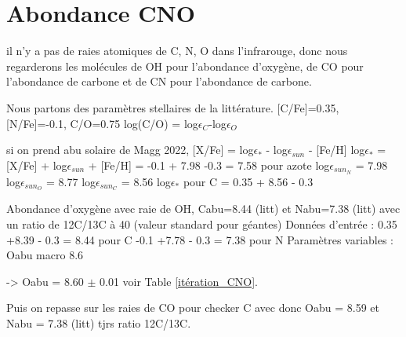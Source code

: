 \section{\sc Abondance CNO}
il n'y a pas de raies atomiques de C, N, O dans l'infrarouge, donc nous regarderons les molécules de OH pour l'abondance d'oxygène, de CO pour l'abondance de carbone et de CN pour l'abondance de carbone. 

Nous partons des paramètres stellaires de la littérature. [C/Fe]=0.35, [N/Fe]=-0.1, C/O=0.75
 log(C/O) = log$\epsilon_C$-log$\epsilon_O$

si on prend abu solaire de Magg 2022, 
[X/Fe] = log$\epsilon_*$ - log$\epsilon_{sun}$ - [Fe/H]
log$\epsilon_*$ = [X/Fe] + log$\epsilon_{sun}$ + [Fe/H]
= -0.1 + 7.98 -0.3 = 7.58 pour azote
log$\epsilon_{sun_N}$ = 7.98
log$\epsilon_{sun_O}$ = 8.77
log$\epsilon_{sun_C}$ = 8.56
log$\epsilon_*$ pour C = 0.35 + 8.56 - 0.3

Abondance d'oxygène avec raie de OH, Cabu=8.44 (litt) et Nabu=7.38 (litt) \cite{grevesse_solar_2007}
avec un ratio de 12C/13C à 40 (valeur standard pour géantes)
Données d'entrée :
0.35 +8.39 - 0.3 = 8.44 pour C
-0.1 +7.78 - 0.3 = 7.38 pour N
Paramètres variables : 
Oabu
macro 8.6 



-> Oabu = 8.60 $\pm$ 0.01 voir Table \ref{itération_CNO}. 


Puis on repasse sur les raies de CO pour checker C avec donc Oabu = 8.59 et Nabu = 7.38 (litt)
tjrs ratio 12C/13C. 


